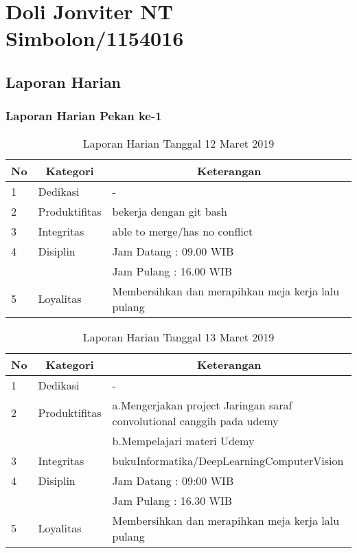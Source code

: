 \chapter{Doli Jonviter NT Simbolon/1154016}


\section{Laporan Harian}
\subsection{Laporan Harian Pekan ke-1}


\begin{table}[htp]
\caption{Laporan Harian Tanggal 12 Maret 2019}
\label{tab:lh120319}
\begin{tabular}{|l|l|l|}
\hline
\textbf{No} & \multicolumn{1}{c|}{\textbf{Kategori}} & \multicolumn{1}{c|}{\textbf{Keterangan}} \\ \hline
1 & Dedikasi & - \\ \hline
2 & Produktifitas & bekerja dengan git bash \\
3 & Integritas & able to merge/has no conflict \\ \hline
4 & Disiplin & Jam Datang : 09.00 WIB \\
 &  & Jam Pulang : 16.00 WIB \\ \hline
5 & Loyalitas & Membersihkan dan merapihkan meja kerja lalu pulang  \\ \hline
\end{tabular}
\end{table}



\begin{table}[htp]
\caption{Laporan Harian Tanggal 13 Maret 2019}
\label{tab:lh130319}
\begin{tabular}{|l|l|l|}
\hline
\textbf{No} & \multicolumn{1}{c|}{\textbf{Kategori}} & \multicolumn{1}{c|}{\textbf{Keterangan}} \\ \hline
1 & Dedikasi & - \\ \hline
2 & Produktifitas & a.Mengerjakan project Jaringan saraf convolutional canggih pada udemy \\
  & & b.Mempelajari materi Udemy \\ \hline
3 & Integritas & bukuInformatika/DeepLearningComputerVision \\ \hline
4 & Disiplin & Jam Datang : 09:00 WIB \\
 &  & Jam Pulang : 16.30 WIB \\ \hline
5 & Loyalitas & Membersihkan dan merapihkan meja kerja lalu pulang \\ \hline
\end{tabular}
\end{table}


